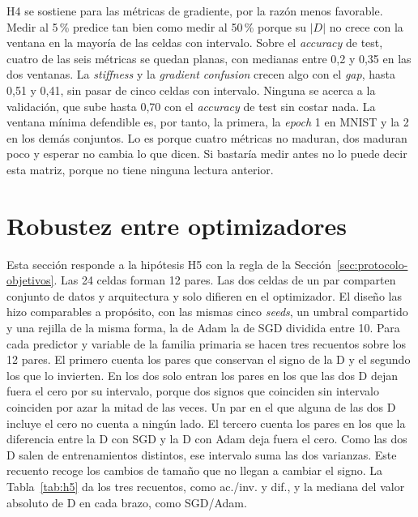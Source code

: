 H4 se sostiene para las métricas de gradiente, por la razón menos favorable. Medir al 5\,\% predice tan bien como medir al 50\,\% porque su $|D|$ no crece con la ventana en la mayoría de las celdas con intervalo. Sobre el \emph{accuracy} de test, cuatro de las seis métricas se quedan planas, con medianas entre 0,2 y 0,35 en las dos ventanas. La \emph{stiffness} y la \emph{gradient confusion} crecen algo con el \emph{gap}, hasta 0,51 y 0,41, sin pasar de cinco celdas con intervalo. Ninguna se acerca a la validación, que sube hasta 0,70 con el \emph{accuracy} de test sin costar nada. La ventana mínima defendible es, por tanto, la primera, la \emph{epoch} 1 en MNIST y la 2 en los demás conjuntos. Lo es porque cuatro métricas no maduran, dos maduran poco y esperar no cambia lo que dicen. Si bastaría medir antes no lo puede decir esta matriz, porque no tiene ninguna lectura anterior.

\section{Robustez entre optimizadores}
\label{sec:res-robustez}

Esta sección responde a la hipótesis H5 con la regla de la Sección~\ref{sec:protocolo-objetivos}. Las 24 celdas forman 12 pares. Las dos celdas de un par comparten conjunto de datos y arquitectura y solo difieren en el optimizador. El diseño las hizo comparables a propósito, con las mismas cinco \emph{seeds}, un umbral compartido y una rejilla de la misma forma, la de Adam la de SGD dividida entre 10. Para cada predictor y variable de la familia primaria se hacen tres recuentos sobre los 12 pares. El primero cuenta los pares que conservan el signo de la D y el segundo los que lo invierten. En los dos solo entran los pares en los que las dos D dejan fuera el cero por su intervalo, porque dos signos que coinciden sin intervalo coinciden por azar la mitad de las veces. Un par en el que alguna de las dos D incluye el cero no cuenta a ningún lado. El tercero cuenta los pares en los que la diferencia entre la D con SGD y la D con Adam deja fuera el cero. Como las dos D salen de entrenamientos distintos, ese intervalo suma las dos varianzas. Este recuento recoge los cambios de tamaño que no llegan a cambiar el signo. La Tabla~\ref{tab:h5} da los tres recuentos, como ac./inv. y dif., y la mediana del valor absoluto de D en cada brazo, como SGD/Adam.

